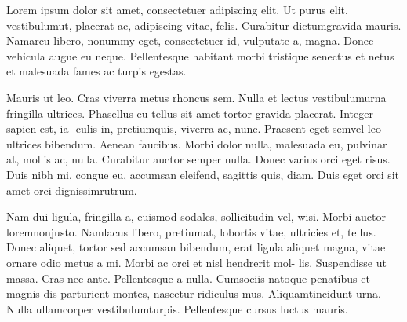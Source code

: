 \documentclass[12pt,a4paper]{article}
\begin{document}
	
 

Lorem ipsum dolor sit amet, consectetuer adipiscing elit. Ut purus elit,
vestibulumut, placerat ac, adipiscing vitae, felis. Curabitur dictumgravida
mauris. Namarcu libero, nonummy eget, consectetuer id, vulputate a, magna.
 Donec vehicula augue eu neque. Pellentesque habitant morbi tristique
senectus et netus et malesuada fames ac turpis egestas. 

Mauris ut leo. Cras viverra metus rhoncus sem. Nulla et lectus vestibulumurna fringilla ultrices.
Phasellus eu tellus sit amet tortor gravida placerat. Integer sapien est, ia-
culis in, pretiumquis, viverra ac, nunc. Praesent eget semvel leo ultrices
bibendum. Aenean faucibus. Morbi dolor nulla, malesuada eu, pulvinar at,
mollis ac, nulla. Curabitur auctor semper nulla. Donec varius orci eget risus.
Duis nibh mi, congue eu, accumsan eleifend, sagittis quis, diam. Duis eget
orci sit amet orci dignissimrutrum.

Nam dui ligula, fringilla a, euismod sodales, sollicitudin vel, wisi. Morbi
auctor loremnonjusto. Namlacus libero, pretiumat, lobortis vitae, ultricies
et, tellus. Donec aliquet, tortor sed accumsan bibendum, erat ligula aliquet
magna, vitae ornare odio metus a mi. Morbi ac orci et nisl hendrerit mol-
lis. Suspendisse ut massa. Cras nec ante. Pellentesque a nulla. Cumsociis
natoque penatibus et magnis dis parturient montes, nascetur ridiculus mus.
Aliquamtincidunt urna. Nulla ullamcorper vestibulumturpis. Pellentesque
cursus luctus mauris.
\end{document}
